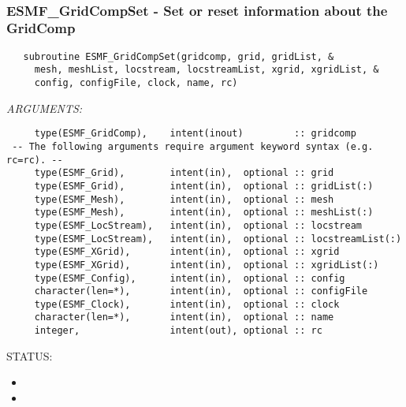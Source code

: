    
 
\mbox{}\hrulefill\ 
 
\subsubsection [ESMF\_GridCompSet] {ESMF\_GridCompSet - Set or reset information about the GridComp}


  
\begin{verbatim}   subroutine ESMF_GridCompSet(gridcomp, grid, gridList, &
     mesh, meshList, locstream, locstreamList, xgrid, xgridList, &
     config, configFile, clock, name, rc)\end{verbatim}{\em ARGUMENTS:}
\begin{verbatim}     type(ESMF_GridComp),    intent(inout)         :: gridcomp
 -- The following arguments require argument keyword syntax (e.g. rc=rc). --
     type(ESMF_Grid),        intent(in),  optional :: grid
     type(ESMF_Grid),        intent(in),  optional :: gridList(:)
     type(ESMF_Mesh),        intent(in),  optional :: mesh
     type(ESMF_Mesh),        intent(in),  optional :: meshList(:)
     type(ESMF_LocStream),   intent(in),  optional :: locstream
     type(ESMF_LocStream),   intent(in),  optional :: locstreamList(:)
     type(ESMF_XGrid),       intent(in),  optional :: xgrid
     type(ESMF_XGrid),       intent(in),  optional :: xgridList(:)
     type(ESMF_Config),      intent(in),  optional :: config
     character(len=*),       intent(in),  optional :: configFile
     type(ESMF_Clock),       intent(in),  optional :: clock
     character(len=*),       intent(in),  optional :: name
     integer,                intent(out), optional :: rc\end{verbatim}
{\sf STATUS:}
   \begin{itemize}
   \item{}
   \item{}
   \end{itemize}
  
